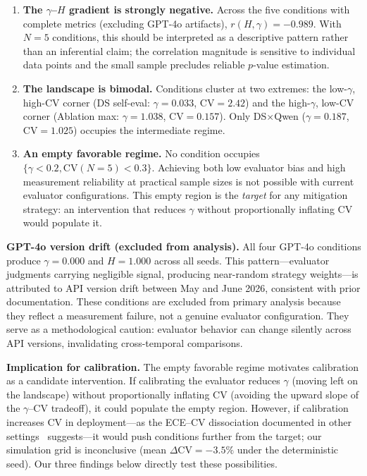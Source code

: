 \documentclass[11pt]{article}
\newcommand{\CV}{\ensuremath{\mathrm{CV}}}
\theoremstyle{definition}
\theoremstyle{remark}
\begin{document}
\begin{enumerate}[leftmargin=*,nosep]
 \item \textbf{The $\gamma$--$H$ gradient is strongly negative.} Across the five conditions with complete metrics (excluding GPT-4o artifacts), $r(H, \gamma) = -0.989$. With $N{=}5$ conditions, this should be interpreted as a descriptive pattern rather than an inferential claim; the correlation magnitude is sensitive to individual data points and the small sample precludes reliable $p$-value estimation.
 \item \textbf{The landscape is bimodal.} Conditions cluster at two extremes: the low-$\gamma$, high-CV corner (DS self-eval: $\gamma{=}0.033$, CV${=}2.42$) and the high-$\gamma$, low-CV corner (Ablation max: $\gamma{=}1.038$, CV${=}0.157$). Only DS$\times$Qwen ($\gamma{=}0.187$, CV${=}1.025$) occupies the intermediate regime.
 \item \textbf{An empty favorable regime.} No condition occupies $\{\gamma < 0.2, \CV(N{=}5) < 0.3\}$. Achieving both low evaluator bias and high measurement reliability at practical sample sizes is not possible with current evaluator configurations. This empty region is the \textit{target} for any mitigation strategy: an intervention that reduces $\gamma$ without proportionally inflating CV would populate it.
\end{enumerate}

\textbf{GPT-4o version drift (excluded from analysis).} All four GPT-4o conditions produce $\gamma{=}0.000$ and $H{=}1.000$ across all seeds. This pattern---evaluator judgments carrying negligible signal, producing near-random strategy weights---is attributed to API version drift between May and June 2026, consistent with prior documentation. These conditions are excluded from primary analysis because they reflect a measurement failure, not a genuine evaluator configuration. They serve as a methodological caution: evaluator behavior can change silently across API versions, invalidating cross-temporal comparisons.

\textbf{Implication for calibration.} The empty favorable regime motivates calibration as a candidate intervention. If calibrating the evaluator reduces $\gamma$ (moving left on the landscape) without proportionally inflating CV (avoiding the upward slope of the $\gamma$--CV tradeoff), it could populate the empty region. However, if calibration increases CV in deployment---as the ECE--CV dissociation documented in other settings~\cite{he2026paradox} suggests---it would push conditions further from the target; our simulation grid is inconclusive (mean $\Delta\CV = -3.5\%$ under the deterministic seed). Our three findings below directly test these possibilities.
\end{document}
